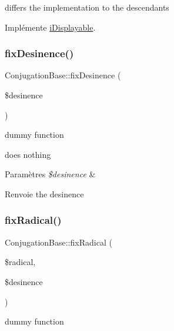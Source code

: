 differs the implementation to the descendants 

Implémente \hyperlink{interfacei_displayable_a0264fd455c876e897f754cf85f1681ca}{i\+Displayable}.

\hypertarget{class_conjugation_base_ab983db20dcc0f19fdce07fd4a8fdbc18}{}\label{class_conjugation_base_ab983db20dcc0f19fdce07fd4a8fdbc18} 
\subsubsection{\texorpdfstring{fix\+Desinence()}{fixDesinence()}}
{\footnotesize\ttfamily Conjugation\+Base\+::fix\+Desinence (\begin{DoxyParamCaption}\item[{}]{\$desinence }\end{DoxyParamCaption})\hspace{0.3cm}{\ttfamily [protected]}}



dummy function 

does nothing


\begin{DoxyParams}{Paramètres}
{\em \$desinence} & \\
\hline
\end{DoxyParams}
\begin{DoxyReturn}{Renvoie}
the desinence 
\end{DoxyReturn}
\hypertarget{class_conjugation_base_ab55301132f0c90c3b5bf7f6cb44fc6b4}{}\label{class_conjugation_base_ab55301132f0c90c3b5bf7f6cb44fc6b4} 
\subsubsection{\texorpdfstring{fix\+Radical()}{fixRadical()}}
{\footnotesize\ttfamily Conjugation\+Base\+::fix\+Radical (\begin{DoxyParamCaption}\item[{}]{\$radical,  }\item[{}]{\$desinence }\end{DoxyParamCaption})\hspace{0.3cm}{\ttfamily [protected]}}



dummy function 

